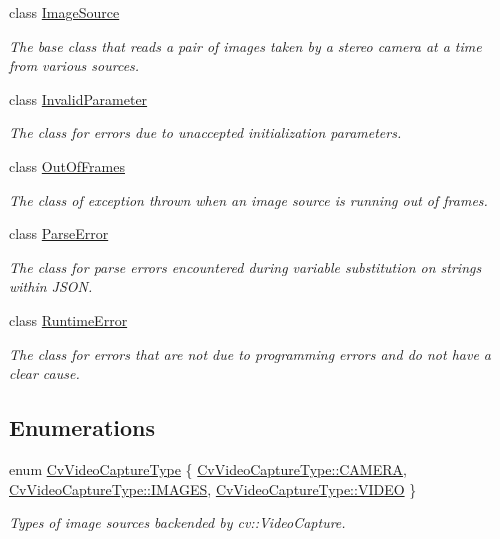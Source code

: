 \begin{DoxyCompactItemize}
class \hyperlink{classstereo__ugv_1_1ImageSource}{Image\+Source}
\begin{DoxyCompactList}\small\item\em The base class that reads a pair of images taken by a stereo camera at a time from various sources. \end{DoxyCompactList}\item 
class \hyperlink{classstereo__ugv_1_1InvalidParameter}{Invalid\+Parameter}
\begin{DoxyCompactList}\small\item\em The class for errors due to unaccepted initialization parameters. \end{DoxyCompactList}\item 
class \hyperlink{classstereo__ugv_1_1OutOfFrames}{Out\+Of\+Frames}
\begin{DoxyCompactList}\small\item\em The class of exception thrown when an image source is running out of frames. \end{DoxyCompactList}\item 
class \hyperlink{classstereo__ugv_1_1ParseError}{Parse\+Error}
\begin{DoxyCompactList}\small\item\em The class for parse errors encountered during variable substitution on strings within J\+S\+ON. \end{DoxyCompactList}\item 
class \hyperlink{classstereo__ugv_1_1RuntimeError}{Runtime\+Error}
\begin{DoxyCompactList}\small\item\em The class for errors that are not due to programming errors and do not have a clear cause. \end{DoxyCompactList}\end{DoxyCompactItemize}
\subsection*{Enumerations}
\begin{DoxyCompactItemize}
\item 
enum \hyperlink{namespacestereo__ugv_a5c139e7cfac12e9270ca903f1ce2e4bc}{Cv\+Video\+Capture\+Type} \{ \hyperlink{namespacestereo__ugv_a5c139e7cfac12e9270ca903f1ce2e4bcaddf0d6b21537d984fea6544f58101fa8}{Cv\+Video\+Capture\+Type\+::\+C\+A\+M\+E\+RA}, 
\hyperlink{namespacestereo__ugv_a5c139e7cfac12e9270ca903f1ce2e4bcab34687a3607271050f02aa9bf90c731a}{Cv\+Video\+Capture\+Type\+::\+I\+M\+A\+G\+ES}, 
\hyperlink{namespacestereo__ugv_a5c139e7cfac12e9270ca903f1ce2e4bcae60ae31f67ab883c746bb71c7a145c18}{Cv\+Video\+Capture\+Type\+::\+V\+I\+D\+EO}
 \}\begin{DoxyCompactList}\small\item\em Types of image sources backended by cv\+::\+Video\+Capture. \end{DoxyCompactList}
\end{DoxyCompactItemize}
